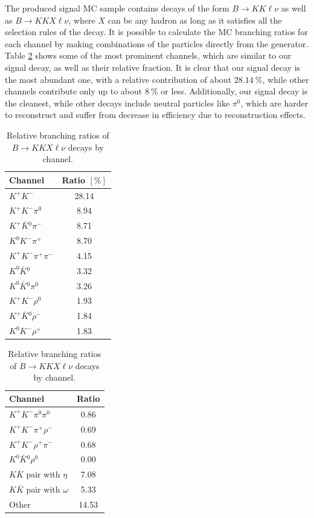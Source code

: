 The produced signal MC sample contains decays of the form $B \to KK\ell \nu$ as well as $B \to KKX\ell \nu$, where $X$ can be any hadron as long as it satisfies all the selection rules of the decay. It is possible to calculate the MC branching ratios for each channel by making combinations of the particles directly from the generator. Table \ref{tab:KKX} shows some of the most prominent channels, which are similar to our signal decay, as well as their relative fraction. It is clear that our signal decay is the most abundant one, with a relative contribution of about $28.14~\%$, while other channels contribute only up to about $8~\%$ or less. Additionally, our signal decay is the cleanest, while other decays include neutral particles like $\pi^0$, which are harder to reconstruct and suffer from decrease in efficiency due to reconstruction effects.
\begin{table}[!htb]
	\centering
	\begin{tabular}{|l|c|}
		\hline
		Channel & Ratio $[\%]$ \\
		\hline 
		$K^+ K^-$ & 28.14 \\
		\hline
		$K^+ K^- \pi^0$ & 8.94 \\
		\hline
		$K^+ \bar{K}{}^0 \pi^-$ & 8.71 \\
		\hline
		$K^0 K^- \pi^+$ & 8.70 \\
		\hline
		$K^+ K^- \pi^+ \pi^-$ & 4.15 \\
		\hline
		$K^0 \bar K {}^0$ & 3.32 \\
		\hline
		$K^0 \bar K {}^0 \pi^0$ & 3.26 \\
		\hline
		$K^+ K^- \rho^0$ & 1.93 \\
		\hline
		$K^+ \bar{K}{}^0 \rho^-$ & 1.84 \\
		\hline
		$K^0 K^- \rho^+$ & 1.83 \\
		\hline
	\end{tabular}
	\begin{tabular}{|l|c|}
		\hline
		Channel & Ratio \\
		\hline 
		$K^+ K^- \pi^0 \pi^0$ & 0.86 \\
		\hline
		$K^+ K^- \pi^+ \rho^-$ & 0.69 \\
		\hline
		$K^+ K^- \rho^+ \pi^-$ & 0.68 \\
		\hline
		$K^0 \bar K {}^0 \rho^0$ & 0.00 \\
		\hline
		\hline
		$K \bar K$ pair with $\eta$ & 7.08 \\
		\hline
		$K \bar K$ pair with $\omega$ & 5.33 \\
		\hline
		Other & 14.53 \\
		\hline
	\end{tabular}
	\caption{Relative branching ratios of $B \to KKX\ell \nu$ decays by channel.}
	\label{tab:KKX}
\end{table}

